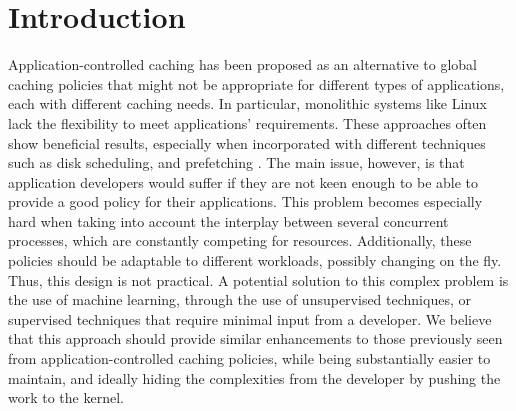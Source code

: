 \section{Introduction}

Application-controlled caching has been proposed as an alternative to global caching policies that might not be appropriate for different types of applications, each with different caching needs. In particular, monolithic systems like Linux lack the flexibility to meet applications' requirements. These approaches often show beneficial results, especially when incorporated with different techniques such as disk scheduling, and prefetching \cite{Cao:1996}. The main issue, however, is that application developers would suffer if they are not keen enough to be able to provide a good policy for their applications. This problem becomes especially hard when taking into account the interplay between several concurrent processes, which are constantly competing for resources. Additionally, these policies should be adaptable to different workloads, possibly changing on the fly. Thus, this design is not practical. A potential solution to this complex problem is the use of machine learning, through the use of unsupervised techniques, or supervised techniques that require minimal input from a developer. We believe that this approach should provide similar enhancements to those previously seen from application-controlled caching policies, while being substantially easier to maintain, and ideally hiding the complexities from the developer by pushing the work to the kernel.
